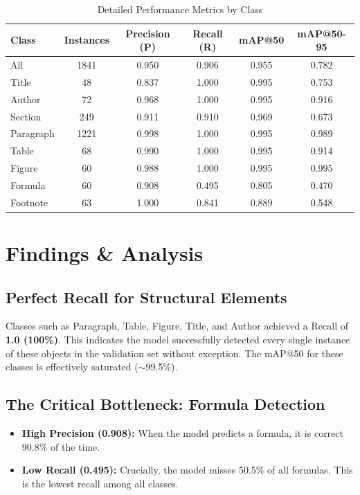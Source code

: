 \documentclass{article}
\begin{document}
\begin{table}[h]
    \centering
    \begin{tabular}{lccccc}
        \toprule
        \textbf{Class} & \textbf{Instances} & \textbf{Precision (P)} & \textbf{Recall (R)} & \textbf{mAP@50} & \textbf{mAP@50-95} \\
        \midrule
        All & 1841 & 0.950 & 0.906 & 0.955 & 0.782 \\
        Title & 48 & 0.837 & 1.000 & 0.995 & 0.753 \\
        Author & 72 & 0.968 & 1.000 & 0.995 & 0.916 \\
        Section & 249 & 0.911 & 0.910 & 0.969 & 0.673 \\
        Paragraph & 1221 & 0.998 & 1.000 & 0.995 & 0.989 \\
        Table & 68 & 0.990 & 1.000 & 0.995 & 0.914 \\
        Figure & 60 & 0.988 & 1.000 & 0.995 & 0.995 \\
        Formula & 60 & 0.908 & 0.495 & 0.805 & 0.470 \\
        Footnote & 63 & 1.000 & 0.841 & 0.889 & 0.548 \\
        \bottomrule
    \end{tabular}
    \caption{Detailed Performance Metrics by Class}
\end{table}

\section{Findings \& Analysis}
\subsection{Perfect Recall for Structural Elements}
Classes such as Paragraph, Table, Figure, Title, and Author achieved a Recall of \textbf{1.0 (100\%)}. This indicates the model successfully detected every single instance of these objects in the validation set without exception. The mAP@50 for these classes is effectively saturated ($\sim$99.5\%).

\subsection{The Critical Bottleneck: Formula Detection}
\begin{itemize}
    \item \textbf{High Precision (0.908):} When the model predicts a formula, it is correct 90.8\% of the time.
    \item \textbf{Low Recall (0.495):} Crucially, the model misses 50.5\% of all formulas. This is the lowest recall among all classes.
\end{itemize}
\end{document}
